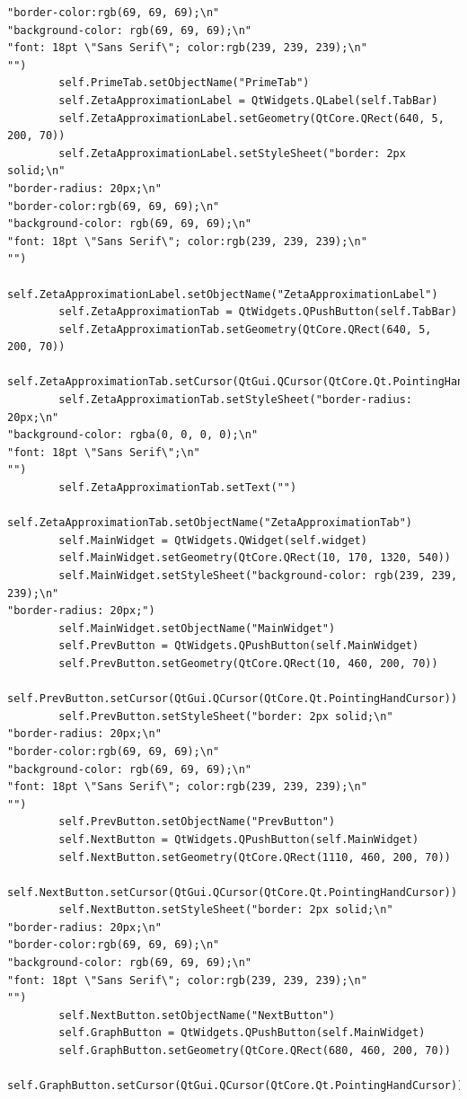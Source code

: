\documentclass{article}
\begin{document}
\begin{lstlisting}
"border-color:rgb(69, 69, 69);\n"
"background-color: rgb(69, 69, 69);\n"
"font: 18pt \"Sans Serif\"; color:rgb(239, 239, 239);\n"
"")
        self.PrimeTab.setObjectName("PrimeTab")
        self.ZetaApproximationLabel = QtWidgets.QLabel(self.TabBar)
        self.ZetaApproximationLabel.setGeometry(QtCore.QRect(640, 5, 200, 70))
        self.ZetaApproximationLabel.setStyleSheet("border: 2px solid;\n"
"border-radius: 20px;\n"
"border-color:rgb(69, 69, 69);\n"
"background-color: rgb(69, 69, 69);\n"
"font: 18pt \"Sans Serif\"; color:rgb(239, 239, 239);\n"
"")
        self.ZetaApproximationLabel.setObjectName("ZetaApproximationLabel")
        self.ZetaApproximationTab = QtWidgets.QPushButton(self.TabBar)
        self.ZetaApproximationTab.setGeometry(QtCore.QRect(640, 5, 200, 70))
        self.ZetaApproximationTab.setCursor(QtGui.QCursor(QtCore.Qt.PointingHandCursor))
        self.ZetaApproximationTab.setStyleSheet("border-radius: 20px;\n"
"background-color: rgba(0, 0, 0, 0);\n"
"font: 18pt \"Sans Serif\";\n"
"")
        self.ZetaApproximationTab.setText("")
        self.ZetaApproximationTab.setObjectName("ZetaApproximationTab")
        self.MainWidget = QtWidgets.QWidget(self.widget)
        self.MainWidget.setGeometry(QtCore.QRect(10, 170, 1320, 540))
        self.MainWidget.setStyleSheet("background-color: rgb(239, 239, 239);\n"
"border-radius: 20px;")
        self.MainWidget.setObjectName("MainWidget")
        self.PrevButton = QtWidgets.QPushButton(self.MainWidget)
        self.PrevButton.setGeometry(QtCore.QRect(10, 460, 200, 70))
        self.PrevButton.setCursor(QtGui.QCursor(QtCore.Qt.PointingHandCursor))
        self.PrevButton.setStyleSheet("border: 2px solid;\n"
"border-radius: 20px;\n"
"border-color:rgb(69, 69, 69);\n"
"background-color: rgb(69, 69, 69);\n"
"font: 18pt \"Sans Serif\"; color:rgb(239, 239, 239);\n"
"")
        self.PrevButton.setObjectName("PrevButton")
        self.NextButton = QtWidgets.QPushButton(self.MainWidget)
        self.NextButton.setGeometry(QtCore.QRect(1110, 460, 200, 70))
        self.NextButton.setCursor(QtGui.QCursor(QtCore.Qt.PointingHandCursor))
        self.NextButton.setStyleSheet("border: 2px solid;\n"
"border-radius: 20px;\n"
"border-color:rgb(69, 69, 69);\n"
"background-color: rgb(69, 69, 69);\n"
"font: 18pt \"Sans Serif\"; color:rgb(239, 239, 239);\n"
"")
        self.NextButton.setObjectName("NextButton")
        self.GraphButton = QtWidgets.QPushButton(self.MainWidget)
        self.GraphButton.setGeometry(QtCore.QRect(680, 460, 200, 70))
        self.GraphButton.setCursor(QtGui.QCursor(QtCore.Qt.PointingHandCursor))

\end{lstlisting}
\end{document}

